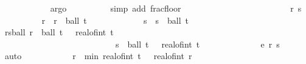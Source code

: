\begin{isabellebody}
\ \ \ \ \ \ \ \ \ \ \isamarkupfalse%
\ argo\isanewline
\ \ \ \ \ \ \ \ \isamarkupfalse%
\ {\isacharparenleft}{\kern0pt}simp\ add{\isacharcolon}{\kern0pt}\ frac{\isacharunderscore}{\kern0pt}floor{\isacharparenright}{\kern0pt}\isanewline
\ \ \ \ \ \ \ \ \isamarkupfalse%
\isanewline
\ \ \ \ \ \ \isacommand{{\isacharbraceleft}{\kern0pt}}\isamarkupfalse%
\isanewline
\ \ \ \ \ \ \ \ \isamarkupfalse%
\ r\ s\isanewline
\ \ \ \ \ \ \ \ \isamarkupfalse%
\ r{\isacharcolon}{\kern0pt}\ \ {\isachardoublequoteopen}r\ {\isasymin}\ ball\ t\ {\isasymepsilon}{\isacharprime}{\kern0pt}\ {\isasyminter}\ {\isacharbraceleft}{\kern0pt}{}{\isachardot}{\kern0pt}{\isachardot}{\kern0pt}{\isacharbraceright}{\kern0pt}{\isachardoublequoteclose}\isanewline
\ \ \ \ \ \ \ \ \isamarkupfalse%
\ s{\isacharcolon}{\kern0pt}\ \ {\isachardoublequoteopen}s\ {\isasymin}\ ball\ t\ {\isasymepsilon}{\isacharprime}{\kern0pt}\ {\isasyminter}\ {\isacharbraceleft}{\kern0pt}{}{\isachardot}{\kern0pt}{\isachardot}{\kern0pt}{\isacharbraceright}{\kern0pt}{\isachardoublequoteclose}\isanewline
\isanewline
\ \ \ \ \ \ \ \ \isamarkupfalse%
\ \isamarkupfalse%
\ rs{\isacharunderscore}{\kern0pt}ball{\isacharcolon}{\kern0pt}\ {\isachardoublequoteopen}r\ {\isasymin}\ ball\ t\ {\isasymepsilon}\ {\isasyminter}\ {\isacharbraceleft}{\kern0pt}{}{\isachardot}{\kern0pt}{\isachardot}{\kern0pt}real{\isacharunderscore}{\kern0pt}of{\isacharunderscore}{\kern0pt}int\ {\isasymlfloor}t{\isasymrfloor}\ {\isacharplus}{\kern0pt}\ {}{\isacharbraceright}{\kern0pt}{\isachardoublequoteclose}\isanewline
\ \ \ \ \ \ \ \ \ \ \ \ \ \ \ \ \ \ \ \ \ \ \ \ \ \ \ {\isachardoublequoteopen}s\ {\isasymin}\ ball\ t\ {\isasymepsilon}\ {\isasyminter}\ {\isacharbraceleft}{\kern0pt}{}{\isachardot}{\kern0pt}{\isachardot}{\kern0pt}real{\isacharunderscore}{\kern0pt}of{\isacharunderscore}{\kern0pt}int\ {\isasymlfloor}t{\isasymrfloor}\ {\isacharplus}{\kern0pt}\ {}{\isacharbraceright}{\kern0pt}{\isachardoublequoteclose}\isanewline
\ \ \ \ \ \ \ \ \ \ \isamarkupfalse%
\ e{\isacharprime}{\kern0pt}\ r\ s\ \isamarkupfalse%
\ auto\isanewline
\ \ \ \ \ \ \ \ \isamarkupfalse%
\ \isamarkupfalse%
\ {\isachardoublequoteopen}r\ {\isasymin}\ {\isacharbraceleft}{\kern0pt}{}{\isachardot}{\kern0pt}{\isachardot}{\kern0pt}min\ {\isacharparenleft}{\kern0pt}real{\isacharunderscore}{\kern0pt}of{\isacharunderscore}{\kern0pt}int\ {\isasymlfloor}t{\isasymrfloor}\ {\isacharplus}{\kern0pt}\ {}{\isacharparenright}{\kern0pt}\ {\isacharparenleft}{\kern0pt}real{\isacharunderscore}{\kern0pt}of{\isacharunderscore}{\kern0pt}int\ {\isasymlfloor}r\ {\isacharplus}{\kern0pt}\ {}{\isasymrfloor}{\isacharparenright}{\kern0pt}{\isacharbraceright}{\kern0pt}{\isachardoublequoteclose}\isanewline

\end{isabellebody}
